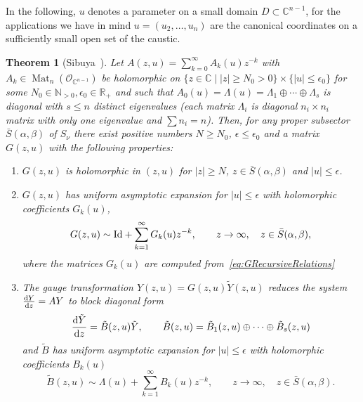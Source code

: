 \documentclass[10pt,a4paper]{amsart}
\numberwithin{equation}{section}
\newtheorem{Theorem}{Theorem}[section]
\begin{document}
In the following, $u$ denotes a parameter on a small domain $D\subset\mathbb{C}^{n-1}$, for the applications we have in mind $u=(u_{2},\dots,u_{n})$ are the canonical coordinates on a sufficiently small open set of the caustic.
\begin{Theorem}[Sibuya~\cite{Sibuya}]
 Let $A(z,u)=\sum_{k=0}^{\infty}A_{k}(u)z^{-k}$ with $A_{k}\in \operatorname{Mat}_{n}(\mathcal{O}_{\mathbb{C}^{n-1}})$ be holomorphic on $\{ z\in\mathbb{C} \mid |z| \geq N_{0}>0 \}\times\{ |u|\leq\epsilon_{0} \}$ for some $N_{0}\in\mathbb{N}_{>0},\epsilon_{0}\in\mathbb{R}_{+}$ and such that $A_{0}(u)=\Lambda(u)=\Lambda_{1}\oplus\cdots\oplus\Lambda_{s}$ is diagonal with $s\leq n$ distinct eigenvalues \big(each matrix $\Lambda_{i}$ is diagonal $n_{i}\times n_{i}$ matrix with only one eigenvalue and $\sum n_{i}=n$\big). Then, for any proper subsector~$\bar{S}(\alpha,\beta)$ of $S_{\nu}$ there exist positive numbers $N\geq N_{0}$, $\epsilon\leq\epsilon_{0}$ and a matrix $G(z,u)$ with the following properties:
 \begin{enumerate}\itemsep=0pt
 \item[$1.$] $G(z,u)$ is holomorphic in $(z,u)$ for $|z|\geq N$, $z\in\bar{S}(\alpha,\beta)$ and $|u|\leq\epsilon$.
 \item[$2.$] $G(z,u)$ has uniform asymptotic expansion for $|u|\leq\epsilon$ with holomorphic coefficients $G_{k}(u)$,
 \begin{equation*}
 G(z,u)\sim {\rm Id}+\sum_{k=1}^{\infty}G_{k}(u)z^{-k},\qquad z\rightarrow\infty,\quad z\in\bar{S}(\alpha,\beta),
 \end{equation*}
 where the matrices $G_{k}(u)$ are computed from~\eqref{eq:GRecursiveRelations}
 \item[$3.$] The gauge transformation $Y(z,u)=G(z,u)\tilde{Y}(z,u)$ reduces the system $\tfrac{{\rm d}Y}{{\rm d}z}=AY$ to block diagonal form
 \begin{equation*}
 \frac{{\rm d}\tilde{Y}}{{\rm d}z}=\tilde{B}(z,u)\tilde{Y},\qquad \tilde{B}(z,u)=\tilde{B}_{1}(z,u)\oplus\cdots\oplus \tilde{B}_{s}(z,u)
 \end{equation*}
 and $\tilde{B}$ has uniform asymptotic expansion for $|u|\leq\epsilon$ with holomorphic coefficients $B_{k}(u)$
 \begin{equation*}
 \tilde{B}(z,u)\sim\Lambda(u)+\sum_{k=1}^{\infty}B_{k}(u)z^{-k},\qquad z\rightarrow\infty,\quad z\in\bar{S}(\alpha,\beta).
 \end{equation*}
 \end{enumerate}
\end{Theorem}
\end{document}
